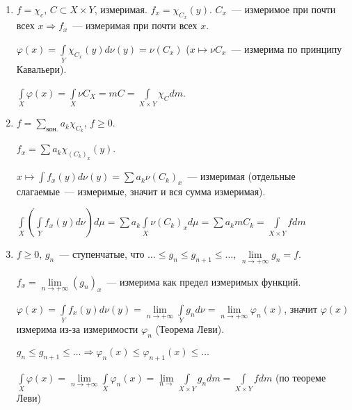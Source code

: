 \documentclass{article}
\begin{document}
            \begin{enumerate}
            
                \item $f = \chi_c$, $C \subset X \times Y$, измеримая. $f_x = \chi_{C_x} (y)$. $C_x$~--- измеримое при почти всех $x \Rightarrow f_x$~--- измеримая при почти всех $x$.
                
                    $\varphi(x) = \int\limits_{Y} \chi_{C_x} (y) d \nu (y) = \nu (C_x)$ ($x \mapsto \nu C_x$~--- измерима по принципу Кавальери).
                    
                    $\int\limits_{X} \varphi(x) = \int\limits_{X} \nu C_X = m C = \int\limits_{X \times Y} \chi_C d m$.
                
                \item $f = \sum\limits_{\text{кон.}} a_k \chi_{C_k}$, $f \geqslant 0$.
                
                    $f_x = \sum a_k \chi_{(C_k)_x} (y)$.
                    
                    $x \mapsto \int f_x(y) d \nu(y) = \sum a_k \nu (C_k)_x$~--- измеримая (отдельные слагаемые~--- измеримые, значит и вся сумма измеримая).
                    
                    $\int\limits_X \left( \int\limits_{Y} f_x(y) d \nu \right) d \mu = \sum a_k \int\limits_X \nu (C_k)_x d \mu = \sum a_k m C_k = \int\limits_{X \times Y} f d m$
                    
                \item $f \geqslant 0$, $g_n$~--- ступенчатые, что $\ldots \leqslant g_n \leqslant g_{n + 1} \leqslant \ldots$, $\lim\limits_{n \rightarrow +\infty} g_n = f$.
                
                    $f_x = \lim\limits_{n \rightarrow +\infty} (g_n)_x$~--- измерима как предел измеримых функций.
                    
                    $\varphi(x) = \int\limits_Y f_x(y) d \nu (y) = \lim\limits_{n \rightarrow +\infty} \int\limits_{Y} g_n d \nu = \lim\limits_{n \rightarrow +\infty} \varphi_n(x)$, значит $\varphi(x)$ измерима из-за измеримости $\varphi_n$ (Теорема Леви).
                
                    $g_n \leqslant g_{n + 1} \leqslant \ldots \Rightarrow \varphi_n(x) \leqslant \varphi_{n + 1} (x) \leqslant \ldots$
                    
                    $\int\limits_{X} \varphi(x) = \lim\limits_{n \rightarrow +\infty} \int\limits_{X} \varphi_n(x) = \lim\limits_{n \rightarrow} \int\limits_{X \times Y} g_n d m = \int\limits_{X \times Y} f dm$ (по теореме Леви)
                    
            \end{enumerate}
            
\end{document}
